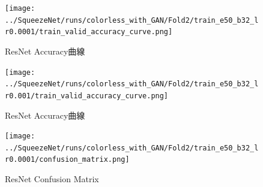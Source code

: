     \begin{figure}[!t]
        \centering
        \texttt{[image: ../SqueezeNet/runs/colorless\_with\_GAN/Fold2/train\_e50\_b32\_lr0.0001/train\_valid\_accuracy\_curve.png]}
        \caption{ResNet Accuracy曲線}
        \label{fig:SqueezeNet_accuracy_curve_0.96}
    \end{figure}
    \begin{figure}[!t]
        \centering
        \texttt{[image: ../SqueezeNet/runs/colorless\_with\_GAN/Fold2/train\_e50\_b32\_lr0.001/train\_valid\_accuracy\_curve.png]}
        \caption{ResNet Accuracy曲線}
        \label{fig:SqueezeNet_accuracy_curve_0.69}
    \end{figure}
    \begin{figure}[!t]
        \centering
        \texttt{[image: ../SqueezeNet/runs/colorless\_with\_GAN/Fold2/train\_e50\_b32\_lr0.0001/confusion\_matrix.png]}
        \caption{ResNet Confusion Matrix}
        \label{fig:SqueezeNet_confuson_matrix}
    \end{figure}
        